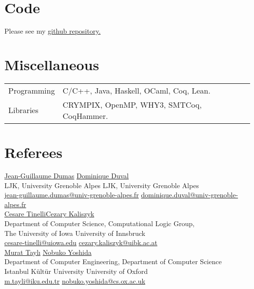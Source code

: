 \documentclass[a4paper,9pt]{article} %
\begin{document}
\section*{Code}

Please see my \href{https://github.com/ekiciburak}{github repository.}

\section*{Miscellaneous}

\begin{tabular}{ll}	
Programming & C/C++, Java, Haskell, OCaml, Coq, Lean. \\
Libraries & CRYMPIX, OpenMP, WHY3, SMTCoq, CoqHammer.
\end{tabular}

\section*{Referees}

\href{http://ljk.imag.fr/membres/Jean-Guillaume.Dumas/}{Jean-Guillaume Dumas} \hfill \href{http://ljk.imag.fr/membres/Dominique.Duval/}{Dominique Duval}\\
LJK, University Grenoble Alpes \hfill LJK, University Grenoble Alpes\\
\href{mailto:jean-guillaume.dumas@univ-grenoble-alpes.fr}{jean-guillaume.dumas@univ-grenoble-alpes.fr} \hfill \href{mailto:dominique.duval@univ-grenoble-alpes.fr}{dominique.duval@univ-grenoble-alpes.fr}\\

\href{http://homepage.cs.uiowa.edu/~tinelli/index.html}{Cesare Tinelli}\hfill \href{http://cl-informatik.uibk.ac.at/users/cek/}{Cezary Kaliszyk}\\
Department of Computer Science, \hfill Computational Logic Group,\\
The University of Iowa \hfill University of Innsbruck\\
\href{mailto:cesare-tinelli@uiowa.edu}{cesare-tinelli@uiowa.edu} \hfill \href{mailto:cezary.kaliszyk@uibk.ac.at}{cezary.kaliszyk@uibk.ac.at}\\


\href{https://bm.iku.edu.tr/tr/bilgisayar-muhendisligi-bolumu-akademik-kadro}{Murat Taylı}\hfill
 \href{https://mrg.cs.ox.ac.uk/people/}{Nobuko Yoshida}\\
Department of Computer Engineering,  \hfill Department of Computer Science\\ 
Istanbul Kültür University \hfill University of Oxford \\
\href{mailto: m.tayli@iku.edu.tr}{m.tayli@iku.edu.tr} \hfill 
\href{mailto: m.tayli@iku.edu.tr}{nobuko.yoshida@cs.ox.ac.uk}
\end{document}
